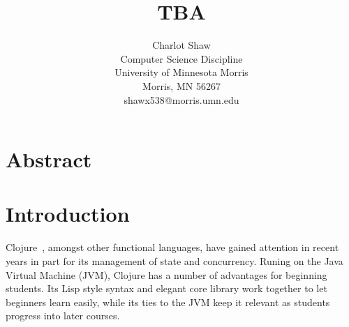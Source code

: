 \documentclass[12pt]{article}
\newcommand{\comment}[1]{{\bf \tt  {#1}}}
\begin{document}
\pagestyle{plain}
%

\title{TBA}
%
%

\author{
Charlot Shaw \\
Computer Science Discipline \\
University of Minnesota Morris\\
Morris, MN 56267\\
shawx538@morris.umn.edu
}
\maketitle
\thispagestyle{empty}

\section*{\centering Abstract}


\newpage
\setcounter{page}{1}

\section{Introduction}
Clojure~\cite{Hickey:2008}, amongst other functional languages, have gained attention in recent years
in part for its management of state and concurrency.
Runing on the Java Virtual Machine (JVM), Clojure has a number of advantages for beginning students.
Its Lisp style syntax and elegant core library
 work together to let beginners learn easily, while
its ties to the JVM keep it relevant as students progress into later courses.
\end{document}
